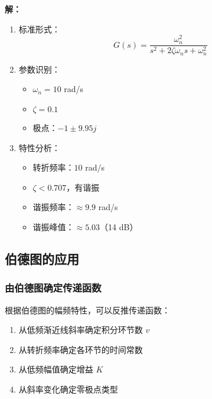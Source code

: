 \begin{tcolorbox}[colback=blue!5!white,colframe=blue!75!black,title=例3求解过程与伯德图]

\begin{minipage}[t]{0.47\textwidth}
\textbf{解：}
\begin{enumerate}
    \item 标准形式：
    $$G(s) = \frac{\omega_n^2}{s^2 + 2\zeta\omega_n s + \omega_n^2}$$
    
    \item 参数识别：
    \begin{itemize}
        \item $\omega_n = 10$ rad/s
        \item $\zeta = 0.1$
        \item 极点：$-1 \pm 9.95j$
    \end{itemize}
    
    \item 特性分析：
    \begin{itemize}
        \item 转折频率：$10$ rad/s
        \item $\zeta < 0.707$，有谐振
        \item 谐振频率：$\approx 9.9$ rad/s
        \item 谐振峰值：$\approx 5.03$（14 dB）
    \end{itemize}
\end{enumerate}
\end{minipage}\hfill
\begin{minipage}[t]{0.47\textwidth}
\end{minipage}

\end{tcolorbox}

\subsection{伯德图的应用}

\subsubsection{由伯德图确定传递函数}
根据伯德图的幅频特性，可以反推传递函数：
\begin{enumerate}
    \item 从低频渐近线斜率确定积分环节数 $v$
    \item 从转折频率确定各环节的时间常数
    \item 从低频幅值确定增益 $K$
    \item 从斜率变化确定零极点类型
\end{enumerate}

